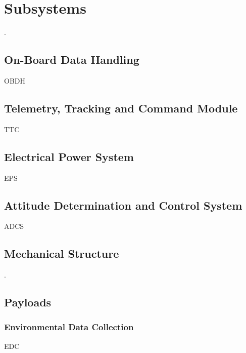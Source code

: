 %
%
%
%
%

%
%
%
%
%
%

\chapter{Subsystems} \label{ch:subsystems}

.

\section{On-Board Data Handling}

OBDH

\section{Telemetry, Tracking and Command Module}

TTC

\section{Electrical Power System}

EPS

\section{Attitude Determination and Control System}

ADCS

\section{Mechanical Structure}

.

\section{Payloads}

\subsection{Environmental Data Collection}

EDC
